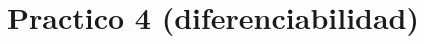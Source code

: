 \documentclass[11pt]{book}
\theoremstyle{definicion}
\theoremstyle{teorema}
\theoremstyle{ejemplo}
\newtheorem{definition}{Definición}
\newtheorem{example}{Ejemplo}
\begin{document}



\newpage

\section{Practico 4 (diferenciabilidad)}
\end{document}
